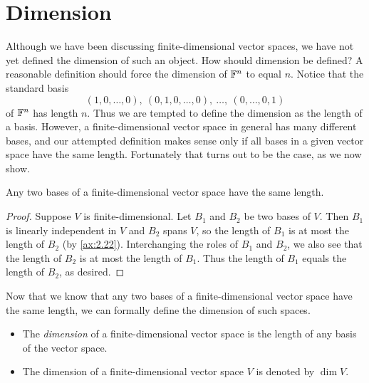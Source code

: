 \iftestbuild %
\setcounter{section}{2}\setcounter{theorem}{33}
\fi %
\providecommand\axeqnum[1]{\refstepcounter{theorem}\tag*{\thetheorem}\label{ax:#1}}
\section{Dimension}

Although we have been discussing finite-dimensional vector spaces, we have not
yet defined the dimension of such an object. How should dimension be defined? A
reasonable definition should force the dimension of $\mathbb{F}^n$ to equal $n$. Notice
that the standard basis
\[ (1,0,\dots,0),\ (0,1,0,\dots,0),\ \dots,\ (0,\dots,0,1) \]
of $\mathbb{F}^n$ has length $n$. Thus we are tempted to define the dimension as the
length of a basis. However, a finite-dimensional vector space in general has
many different bases, and our attempted definition makes sense only if all bases
in a given vector space have the same length. Fortunately that turns out to be
the case, as we now show.

\begin{result}\label{ax:2.34}
Any two bases of a finite-dimensional vector space have the same length.
\end{result}

\begin{proof}
Suppose $V$ is finite-dimensional. Let $B_1$ and $B_2$ be two bases of $V$. Then
$B_1$ is linearly independent in $V$ and $B_2$ spans $V$, so the length of $B_1$
is at most the length of $B_2$ (by \ref{ax:2.22}). Interchanging the roles of
$B_1$ and $B_2$, we also see that the length of $B_2$ is at most the length of
$B_1$. Thus the length of $B_1$ equals the length of $B_2$, as desired.
\end{proof}

Now that we know that any two bases of a finite-dimensional vector space have
the same length, we can formally define the dimension of such spaces.

\begin{definition}\label{ax:2.35}\leavevmode
\begin{itemize}
\item The \emph{dimension} of a finite-dimensional vector space is the length
  of any basis of the vector space.
\item The dimension of a finite-dimensional vector space $V$ is denoted by
  $\dim V$.
\end{itemize}
\end{definition}

